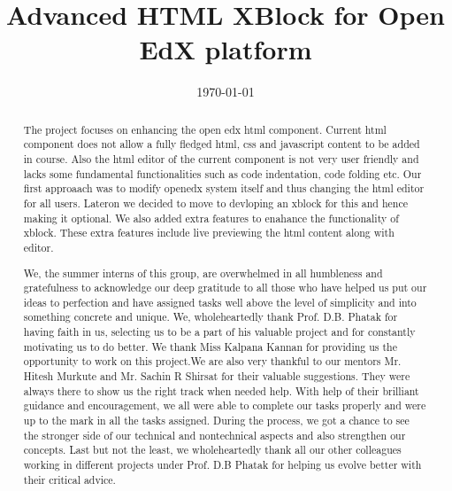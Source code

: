 \documentclass[a4paper, twosided, openany]{memoir}
\begin{document}
\pagestyle{plain}
\title{Advanced HTML XBlock for Open EdX platform}
\date{\today}

\frontmatter

\maketitle

\pagebreak

\begin{abstract}
The project focuses on enhancing the open edx html component. Current html component does not
allow a fully fledged html, css and javascript content to be added in course. Also the html editor of
the current component is not very user friendly and lacks some fundamental functionalities such as
code indentation, code folding etc. Our first approaach was to modify openedx system itself and
thus changing the html editor for all users. Lateron we decided to move to devloping an xblock for
this and hence making it optional. We also added extra features to enahance the functionality of
xblock. These extra features include live previewing the html content along with editor.
\end{abstract}

\pagebreak

\renewcommand{\abstractname}{Acknowledgements}
\begin{abstract}
	We, the summer interns of this group, are overwhelmed in all humbleness and
gratefulness to acknowledge our deep gratitude to all those who have helped us put
our ideas to perfection and have assigned tasks well above the level of simplicity and
into something concrete and unique.
We, wholeheartedly thank Prof. D.B. Phatak for having faith in us, selecting us to be
a part of his valuable project and for constantly motivating us to do better.
We thank Miss Kalpana Kannan for providing us the opportunity to work on this
project.We are also very thankful to our mentors Mr. Hitesh Murkute and Mr. Sachin R Shirsat
for their valuable suggestions. They were always there to show us the right track when needed help.
With help of their brilliant guidance and encouragement, we all were able to complete
our tasks properly and were up to the mark in all the tasks assigned. During the
process, we got a chance to see the stronger side of our technical and nontechnical
aspects and also strengthen our concepts.
Last but not the least, we wholeheartedly thank all our other colleagues working in
different projects under Prof. D.B Phatak for helping us evolve better with their critical advice.
\end{abstract}

\pagebreak

\tableofcontents

\mainmatter


\end{document}
